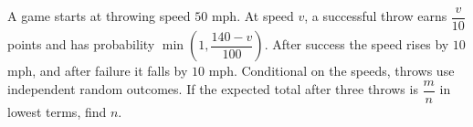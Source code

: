 A game starts at throwing speed $50$ mph. At speed $v$, a successful throw earns $\dfrac{v}{10}$ points and has probability $\min(1,\dfrac{140-v}{100})$. After success the speed rises by $10$ mph, and after failure it falls by $10$ mph. Conditional on the speeds, throws use independent random outcomes. If the expected total after three throws is $\dfrac{m}{n}$ in lowest terms, find $n$.
